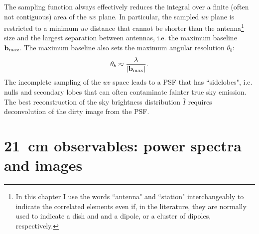 The sampling function always effectively reduces the integral over a finite (often not contiguous) area of the $uv$ plane. In particular, the sampled $uv$ plane is restricted to a minimum $uv$ distance that cannot be shorter than the antenna\footnote{In this chapter I use the words ``antenna" and ``station" interchangeably to indicate the correlated elements even if, in the literature, they are normally used to indicate a dish and and a dipole, or a cluster of dipoles, respectively.} size and the largest separation between antennas, i.e. the maximum baseline ${\bf b}_{\rm max}$. The maximum baseline also sets the maximum angular resolution $\theta_b$:
\begin{equation}
\theta_b \approx \frac{\lambda}{|{\bf b}_{\rm max}|}.
\label{eq:8}
\end{equation}
The incomplete sampling of the $uv$ space leads to a PSF that has ``sidelobes", i.e. nulls and secondary lobes that can often contaminate fainter true sky emission. The best reconstruction of the sky brightness distribution ${\bar I}$ requires deconvolution of the dirty image from the PSF. 




\section{21~cm observables: power spectra and images}
\label{sec:observables}

